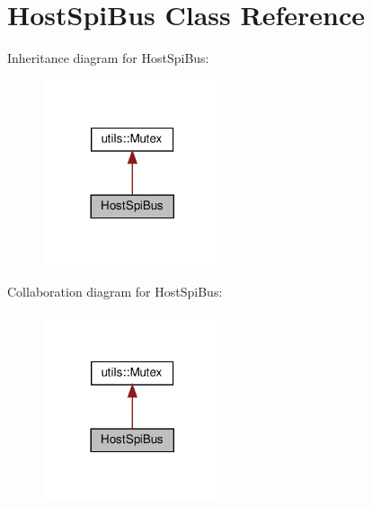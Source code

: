 \hypertarget{classHostSpiBus}{}\section{Host\+Spi\+Bus Class Reference}
\label{classHostSpiBus}


Inheritance diagram for Host\+Spi\+Bus\+:
\nopagebreak
\begin{figure}[H]
\begin{center}
\leavevmode
\includegraphics[width=149pt]{classHostSpiBus__inherit__graph}
\end{center}
\end{figure}


Collaboration diagram for Host\+Spi\+Bus\+:
\nopagebreak
\begin{figure}[H]
\begin{center}
\leavevmode
\includegraphics[width=149pt]{classHostSpiBus__coll__graph}
\end{center}
\end{figure}
